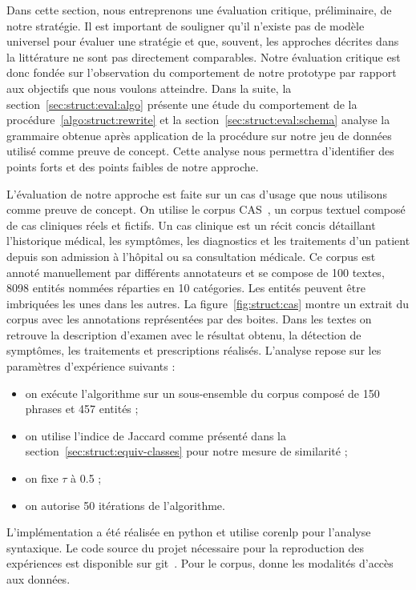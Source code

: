 Dans cette section, nous entreprenons une évaluation critique, préliminaire, de notre stratégie.
Il est important de souligner qu'il n'existe pas de modèle universel pour évaluer une stratégie et que, souvent, les approches décrites dans la littérature ne sont pas directement comparables.
Notre évaluation critique est donc fondée sur l'observation du comportement de notre prototype par rapport aux objectifs que nous voulons atteindre.
Dans la suite, la section~\ref{sec:struct:eval:algo} présente une étude du comportement de la procédure~\ref{algo:struct:rewrite} et la section~\ref{sec:struct:eval:schema} analyse la grammaire obtenue après application de la procédure sur notre jeu de données utilisé comme preuve de concept.
Cette analyse nous permettra d'identifier des points forts et des points faibles de notre approche.

L'évaluation de notre approche est faite sur un cas d'usage que nous utilisons comme preuve de concept.
On utilise le corpus CAS~\cite{grabarCASFrenchCorpus2018}, un corpus textuel composé de cas cliniques réels et fictifs.
Un cas clinique est un récit concis détaillant l'historique médical, les symptômes, les diagnostics et les traitements d'un patient depuis son admission à l'hôpital ou sa consultation médicale.
Ce corpus est annoté manuellement par différents annotateurs et se compose de \num{100} textes, \num{8098} entités nommées réparties en \num{10} catégories.
Les entités peuvent être imbriquées les unes dans les autres.
La figure~\ref{fig:struct:cas} montre un extrait du corpus avec les annotations représentées par des boites.
Dans les textes on retrouve la description d'examen avec le résultat obtenu, la détection de symptômes, les traitements et prescriptions réalisés.
L'analyse repose sur les paramètres d'expérience suivants :
\begin{itemize}
    \item on exécute l'algorithme sur un sous-ensemble du corpus composé de \num{150} phrases et \num{457} entités ;
    \item on utilise l'indice de Jaccard comme présenté dans la section~\ref{sec:struct:equiv-classes} pour notre mesure de similarité ;
    \item on fixe $\tau$ à \num{0.5} ;
    \item on autorise \num{50} itérations de l'algorithme.
\end{itemize}
L'implémentation a été réalisée en \gls{python} et utilise \gls{corenlp} pour l'analyse syntaxique.
Le code source du projet nécessaire pour la reproduction des expériences est disponible sur \gls{git}~\cite{}.
Pour le corpus, \cite{grabarCASFrenchCorpus2018} donne les modalités d'accès aux données.

